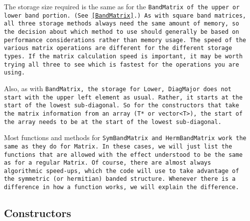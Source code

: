 The storage size required is the same as for the \tt{BandMatrix} of
the upper or lower band portion.
(See \ref{BandMatrix}.)
As with square band matrices, 
all three storage methods always need the same amount of memory, so the 
decision about which method to use should generally be based on performance 
considerations rather than memory usage.
The speed of the various matrix operations are different for the different storage 
types.  If the matrix calculation speed is important, it may be worth trying 
all three to see which is fastest for the operations you are using.

Also, as with \tt{BandMatrix}, the storage for \tt{Lower}, \tt{DiagMajor} 
does not start with the upper left element as usual.
Rather, it starts at the start of the lowest sub-diagonal.  
So for the constructors that 
take the matrix information from an array (\tt{T*} or \tt{vector<T>}), 
the start of the array needs to be at the start of the lowest sub-diagonal.  

Most functions and methods for \tt{SymBandMatrix} and \tt{HermBandMatrix}
work the same as they do for \tt{Matrix}.
In these cases, we will just list the functions that are allowed with the
effect understood to be the same as for a regular \tt{Matrix}.  Of course, there are 
almost always algorithmic speed-ups, which the code will use to take advantage of the 
symmetric (or hermitian) banded structure.
Whenever there is a difference in how a function works,
we will explain the difference.

\subsection{Constructors}
\label{SymBandMatrix_Constructors}

